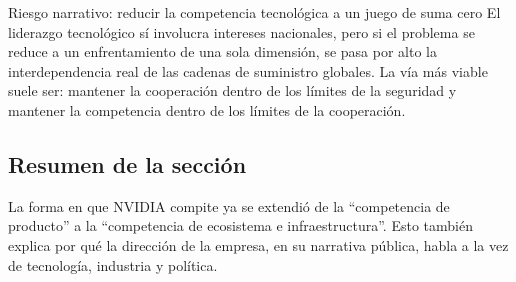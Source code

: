 \begin{warningbox}{Riesgo narrativo: reducir la competencia tecnológica a un juego de suma cero}
El liderazgo tecnológico sí involucra intereses nacionales, pero si el problema se reduce a un enfrentamiento de una sola dimensión, se pasa por alto la interdependencia real de las cadenas de suministro globales. La vía más viable suele ser: mantener la cooperación dentro de los límites de la seguridad y mantener la competencia dentro de los límites de la cooperación.
\end{warningbox}

\subsection{Resumen de la sección}

La forma en que NVIDIA compite ya se extendió de la ``competencia de producto'' a la ``competencia de ecosistema e infraestructura''. Esto también explica por qué la dirección de la empresa, en su narrativa pública, habla a la vez de tecnología, industria y política.

